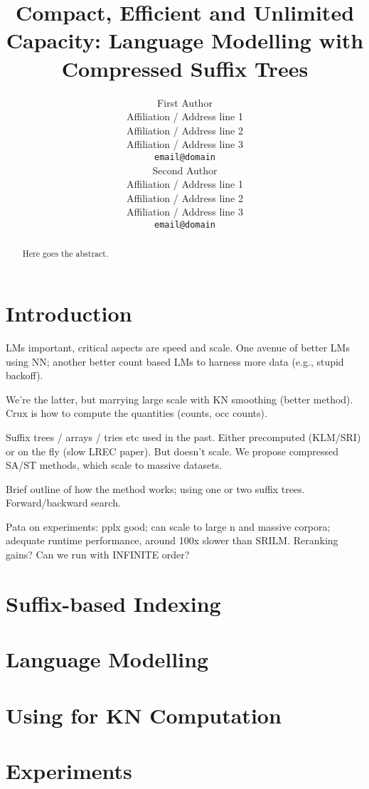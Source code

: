 \documentclass[11pt,a4paper]{article}
\title{Compact, Efficient and Unlimited Capacity:
    Language Modelling with Compressed Suffix Trees}
\author{First Author \\
  Affiliation / Address line 1 \\
  Affiliation / Address line 2 \\
  Affiliation / Address line 3 \\
  {\tt email@domain} \\\And
  Second Author \\
  Affiliation / Address line 1 \\
  Affiliation / Address line 2 \\
  Affiliation / Address line 3 \\
  {\tt email@domain} \\}
\date{}
\begin{document}
\maketitle
\begin{abstract}
  Here goes the abstract.
\end{abstract}

\section{Introduction}

LMs important, critical aspects are speed and scale. One avenue of better LMs using NN; another
better count based LMs to harness more data (e.g., stupid backoff). 

We're the latter, but marrying large scale with KN smoothing (better method). Crux is how to compute
the quantities (counts, occ counts). 

Suffix trees / arrays / tries etc used in the past. Either precomputed (KLM/SRI) or on the fly (slow
LREC paper). But doesn't scale. We propose compressed SA/ST methods, which scale to massive datasets.

Brief outline of how the method works; using one or two suffix trees. Forward/backward search.

Pata on experiments: pplx good; can scale to large n and massive corpora; adequate runtime
performance, around 100x slower than SRILM. Reranking gains? Can we run with INFINITE order?

\section{Suffix-based Indexing}
\label{sec-suffix}


\section{Language Modelling}
\label{sec-lm}


\section{Using \CSTs for KN Computation}
\label{sec-lmsdsl}


\section{Experiments}
\label{sec-experiments}
%
\end{document}
